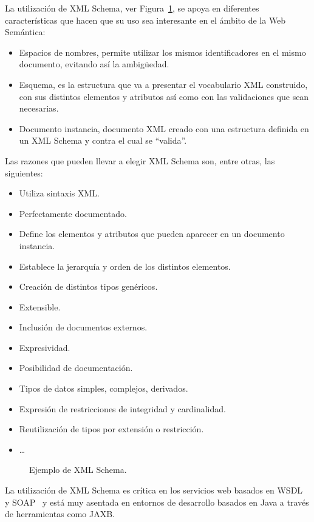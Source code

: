 \begin{description}
La utilización de XML Schema, ver Figura~\ref{fig:xsd-example}, se apoya en diferentes características que hacen
que su uso sea interesante en el ámbito de la Web Semántica:
\begin{itemize}
\item Espacios de nombres, permite utilizar los mismos identificadores en el
mismo documento, evitando así la ambigüedad.
\item Esquema, es la estructura que va a presentar el vocabulario XML construido, con
sus distintos elementos y atributos así como con las validaciones que sean
necesarias.
\item Documento instancia,  documento XML creado con una estructura
definida en un XML Schema y contra el cual se ``valida''.
\end{itemize}

Las razones que pueden llevar a elegir XML Schema son, entre otras, las siguientes:
\begin{itemize}
  \item Utiliza sintaxis XML.
  \item Perfectamente documentado.
  \item Define los elementos y atributos que pueden aparecer en un documento instancia.
  \item Establece la jerarquía y orden de los distintos elementos.
  \item Creación de distintos tipos genéricos.
  \item Extensible.
  \item Inclusión de documentos externos.
  \item Expresividad.
  \item Posibilidad de documentación.
  \item Tipos de datos simples, complejos, derivados.
  \item Expresión de restricciones de integridad y cardinalidad.
  \item Reutilización de tipos por extensión o restricción.
  \item \ldots  
\end{itemize}


\begin{figure}[!htbp]
\centering

\caption{Ejemplo de XML Schema.}
\label{fig:xsd-example}
\end{figure}


La utilización de XML Schema es crítica en los servicios web basados en \gls{WSDL}~\cite{WSDL20} y \gls{SOAP}~\cite{SOAP11} y 
está muy asentada en entornos de desarrollo basados en Java a través de herramientas como \gls{JAXB}.


\end{description}
